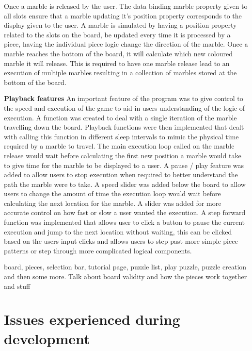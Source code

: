 \documentclass{l4proj}
\begin{document}
Once a marble is released by the user. The data binding marble property given to all slots ensure that a marble updating it's position property corresponds to the display given to the user. A marble is simulated by having a position property related to the slots on the board, be updated every time it is processed by a piece, having the individual piece logic change the direction of the marble. Once a marble reaches the bottom of the board, it will calculate which new coloured marble it will release. This is required to have one marble release lead to an execution of multiple marbles resulting in a collection of marbles stored at the bottom of the board. 

\textbf{Playback features}
An important feature of the program was to give control to the speed and execution of the game to aid in users understanding of the logic of execution. A function was created to deal with a single iteration of the marble travelling down the board. Playback functions were then implemented that dealt with calling this function in different sleep intervals to mimic the physical time required by a marble to travel. The main execution loop called on the marble release would wait before calculating the first new position a marble would take to give time for the marble to be displayed to a user. A pause / play feature was added to allow users to stop execution when required to better understand the path the marble were to take. A speed slider was added below the board to allow users to change the amount of time the execution loop would wait before calculating the next location for the marble. A slider was added for more accurate control on how fast or slow a user wanted the execution. A step forward function was implemented that allows user to click a button to pause the current execution and jump to the next location without waiting, this can be clicked based on the users input clicks and allows users to step past more simple piece patterns or step through more complicated logical components. 




board, pieces, selection bar, tutorial page, puzzle list, play puzzle, puzzle creation and then some more. Talk about board validity and how the pieces work together and stuff


\section{Issues experienced during development}
\end{document}
